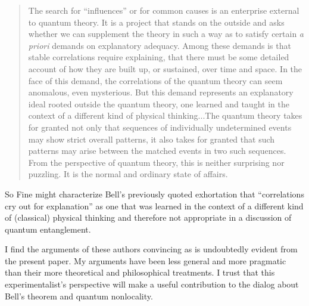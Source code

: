 \documentclass[12pt]{article}
\begin{document}
\begin{quote}
The search for ``influences'' or for common causes is an enterprise external to quantum theory.  It is a project that stands on the outside and asks whether we can supplement the theory in such a way as to satisfy certain {\it a priori} demands on explanatory adequacy.  Among these demands is that stable correlations require explaining, that there must be some detailed account of how they are built up, or sustained, over time and space.  In the face of this demand, the correlations of the quantum theory can seem anomalous, even mysterious.  But this demand represents an explanatory ideal rooted outside the quantum theory, one learned and taught in the context of a different kind of physical thinking...The quantum theory takes for granted not only that sequences of individually undetermined events may show strict overall patterns, it also takes for granted that such patterns may arise between the matched events in two such sequences.  From the perspective of quantum theory, this is neither surprising nor puzzling.  It is the normal and ordinary state of affairs.
\end{quote}
So Fine might characterize Bell's previously quoted exhortation that ``correlations cry out for explanation'' as one that was learned in the context of a different kind of (classical) physical thinking and therefore not appropriate in a discussion of quantum entanglement.

I find the arguments of these authors convincing as is undoubtedly evident from the present paper.  My arguments have been less general and more pragmatic than their more theoretical and philosophical treatments.  I trust that this experimentalist's perspective will make a useful contribution to the dialog about Bell's theorem and quantum nonlocality.

\vspace{7 mm}

\raggedright
\end{document}
